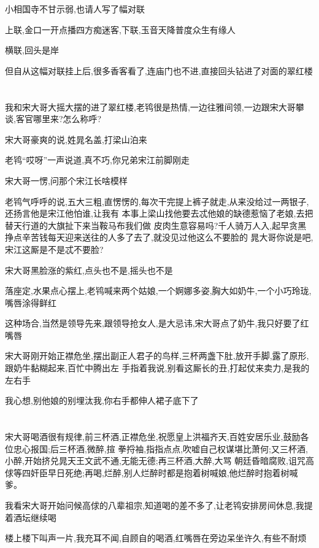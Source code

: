 ﻿\documentclass[12pt]{article}
\begin{document}
小相国寺不甘示弱,也请人写了幅对联

上联,金口一开点播四方痴迷客,下联,玉音天降普度众生有缘人

横联,回头是岸

但自从这幅对联挂上后,很多香客看了,连庙门也不进,直接回头钻进了对面的翠红楼

\section{}

我和宋大哥大摇大摆的进了翠红楼,老鸨很是热情,一边往雅间领,一边跟宋大哥攀谈,客官哪里来?怎么称呼?

宋大哥豪爽的说,姓晁名盖,打梁山泊来

老鸨``哎呀''一声说道,真不巧,你兄弟宋江前脚刚走

宋大哥一愣,问那个宋江长啥模样

老鸨气呼呼的说,五大三粗,直愣愣的,每次干完提上裤子就走,从来没给过一两银子,还扬言他是宋江他怕谁,让我有
本事上梁山找他要去\dldots 忒他娘的缺德\dldots 惹恼了老娘,去把替天行道的大旗扯下来当鞍马布\dldots 我们做
皮肉生意容易吗?千人骑万人入,起早贪黑挣点辛苦钱\dldots 每天迎来送往的人多了去了,就没见过他这么不要脸的
\dldots 晁大哥你说是吧,宋江这厮是不是忒不要脸?

宋大哥黑脸涨的紫红,点头也不是,摇头也不是

落座定,水果点心摆上,老鸨喊来两个姑娘,一个婀娜多姿,胸大如奶牛,一个小巧玲珑,嘴唇涂得鲜红

这种场合,当然是领导先来,跟领导抢女人,是大忌讳,宋大哥点了奶牛,我只好要了红嘴唇

宋大哥刚开始正襟危坐,摆出副正人君子的鸟样,三杯两盏下肚,放开手脚,露了原形,跟奶牛黏糊起来,百忙中腾出左
手指着我说,别看这厮长的丑,打起仗来卖力,是我的左右手

我心想,别他娘的别埋汰我,你右手都伸人裙子底下了
\section{}

宋大哥喝酒很有规律,前三杯酒,正襟危坐,祝愿皇上洪福齐天,百姓安居乐业,鼓励各位忠心报国;后三杯酒,微醉,揎
拳捋袖,指指点点,吹嘘自己权谋堪比萧何;又三杯酒,小醉,开始挤兑晁天王文武不通,无能无德;再三杯酒,大醉,大骂
朝廷昏暗腐败,诅咒高俅等四奸臣早日死绝;再喝,烂醉,别人烂醉时都是抱着树喊娘,他烂醉时抱着树喊爹。

我看宋大哥开始问候高俅的八辈祖宗,知道喝的差不多了,让老鸨安排房间休息,我提着酒坛继续喝

楼上楼下叫声一片,我充耳不闻,自顾自的喝酒,红嘴唇在旁边呆坐许久,有些不耐烦
\end{document}
